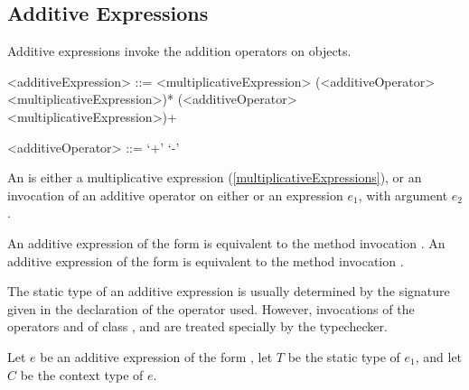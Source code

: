 \documentclass[makeidx]{article}
\begin{document}
{\subsection{Additive Expressions}

\LMHash{}%
Additive expressions invoke the addition operators on objects.

\begin{grammar}
<additiveExpression> ::= <multiplicativeExpression>
  \gnewline{} (<additiveOperator> <multiplicativeExpression>)*
  \alt \SUPER{} (<additiveOperator> <multiplicativeExpression>)+

<additiveOperator> ::= `+'
  \alt `-'
\end{grammar}

\LMHash{}%
An  is either a multiplicative expression
(\ref{multiplicativeExpressions}),
or an invocation of an additive operator
on either \SUPER{} or an expression $e_1$,
with argument $e_2$.

\LMHash{}%
An additive expression of the form 
is equivalent to the method invocation .
An additive expression of the form 
is equivalent to the method invocation .

\LMHash{}%
The static type of an additive expression is usually determined
by the signature given in the declaration of the operator used.
However, invocations of the operators \code{+} and \code{-} of
class ,  and 
are treated specially by the typechecker.

\LMHash{}%
Let $e$ be an additive expression of the form ,
let $T$ be the static type of $e_1$,
and let $C$ be the context type of $e$.

}
\end{document}
